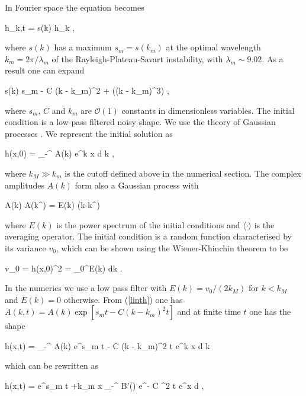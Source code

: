 \newcommand\hhh{\hat h}

In Fourier space the equation becomes

\be
\hhh_{k,t} = s(k) \hhh_k \label{linth} ,
\nd

where $s(k)$ has a maximum $s_m = s(k_m)$ at the optimal wavelength $k_m = 2\pi/\lambda_m$ of
the Rayleigh-Plateau-Savart instability, with $\lambda_m \sim 9.02$.
As a result one can expand

\be
s(k) \simeq s_m -  C (k - k_m)^2 + ((k - k_m)^3) , 
\nd

where $s_m$, $C$ and $k_m$ are $\mathcal{O}(1)$ constants in dimensionless variables.
The initial condition is a low-pass filtered noisy shape. We use the theory of
Gaussian processes .
We represent the initial solution as

\be
h(x,0) = \int_{-\infty}^{\infty}  A(k) e^{\ii k x} {\textrm{d}} k , 
\nd

where $k_M \gg k_m$ is the cutoff defined above in the numerical section. 
The complex amplitudes $A(k)$ form also a Gaussian process \cite{monin1971statistical} with

\be
\langle A(k) \overline A(k^\prime) \rangle =  E(k) \delta(k-k^\prime)
\nd

where $E(k)$ is the power spectrum of the initial conditions and
$\langle \cdot \rangle$ is the averaging operator. 
The initial condition is a random function characterised by its variance 
$v_0$, which can be shown using the Wiener-Khinchin theorem to be 

\be
v_0 = \langle h(x,0)^2 \rangle = \int_0^\infty E(k) {\textrm{d}}k . 
\nd

In the numerics we use a low pass filter
with $E(k)= v_0/(2k_M)$ for $k<k_M$ and $E(k)=0$ otherwise. 
From (\ref{linth}) one has $A(k,t) = A(k) \exp[ s_m t -  C (k - k_m)^2 t]$ and 
at finite time $t$ one has the shape

\be
h(x,t) = \int_{-\infty}^{\infty}  A(k) e^{s_m t -  C (k - k_m)^2 t}  e^{\ii k x} {\textrm{d}} k
\nd

which can be rewritten as 

\be
h(x,t) =  e^{s_m t +\ii k_m x} \int_{-\infty}^{\infty}  B'(\kappa) e^{-  C \kappa^2 t}  e^{\ii \kappa x} {\textrm{d}} \kappa ,
\nd

